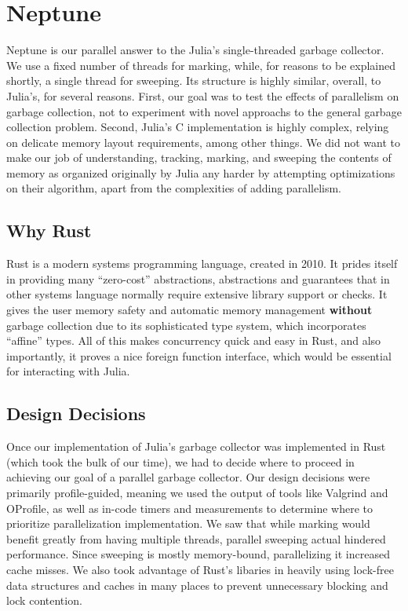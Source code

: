 \section{Neptune} \label{neptune}

Neptune is our parallel answer to the Julia's single-threaded garbage collector.
We use a fixed number of threads for marking, while, for reasons to be explained shortly, a single thread for sweeping.
Its structure is highly similar, overall, to Julia's, for several reasons.
First, our goal was to test the effects of parallelism on garbage collection, not to experiment with novel approachs to the general garbage collection problem.
Second, Julia's C implementation is highly complex, relying on delicate memory layout requirements, among other things.
We did not want to make our job of understanding, tracking, marking, and sweeping the contents of memory as organized originally by Julia any harder by attempting optimizations on their algorithm, apart from the complexities of adding parallelism.

\subsection{Why Rust}
Rust is a modern systems programming language, created in 2010.
It prides itself in providing many ``zero-cost'' abstractions, abstractions and guarantees that in other systems language normally require extensive library support or checks.
It gives the user memory safety and automatic memory management \textbf{without} garbage collection due to its sophisticated type system, which incorporates ``affine'' types.
All of this makes concurrency quick and easy in Rust, and also importantly, it proves a nice foreign function interface, which would be essential for interacting with Julia.

\subsection{Design Decisions}
Once our implementation of Julia's garbage collector was implemented in Rust (which took the bulk of our time), we had to decide where to proceed in achieving our goal of a parallel garbage collector.
Our design decisions were primarily profile-guided, meaning we used the output of tools like Valgrind and OProfile, as well as in-code timers and measurements to determine where to prioritize parallelization implementation.
We saw that while marking would benefit greatly from having multiple threads, parallel sweeping actual hindered performance.
Since sweeping is mostly memory-bound, parallelizing it increased cache misses.
We also took advantage of Rust's libaries in heavily using lock-free data structures and caches in many places to prevent unnecessary blocking and lock contention.

